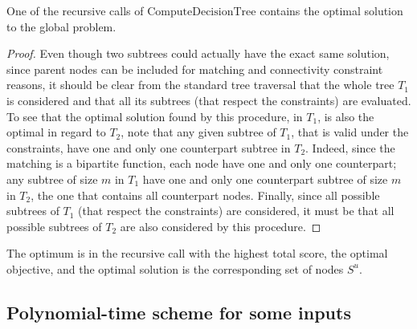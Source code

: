 			\begin{proposition}
				One of the recursive calls of $\text{ComputeDecisionTree}$ contains the optimal solution to the global problem.
			\end{proposition}
			\begin{proof}
				Even though two subtrees could actually have the exact same solution, since parent nodes can be included for matching and connectivity constraint reasons, it should be clear from the standard tree traversal that the whole tree $T_1$ is considered and that all its subtrees (that respect the constraints) are evaluated.
				To see that the optimal solution found by this procedure, in $T_1$, is also the optimal in regard to $T_2$, note that any given subtree of $T_1$, that is valid under the constraints, have one and only one counterpart subtree in $T_2$.
				Indeed, since the matching is a bipartite function, each node have one and only one counterpart; any subtree of size $m$ in $T_1$ have one and only one counterpart subtree of size $m$ in $T_2$, the one that contains all counterpart nodes.
				Finally, since all possible subtrees of $T_1$ (that respect the constraints) are considered, it must be that all possible subtrees of $T_2$ are also considered by this procedure.
			\end{proof}

			The optimum is in the recursive call with the highest total score, the optimal objective, and the optimal solution is the corresponding set of nodes $S^u$.

%
%

		\subsection{Polynomial-time scheme for some inputs}
		\label{subsec:enumerable}

